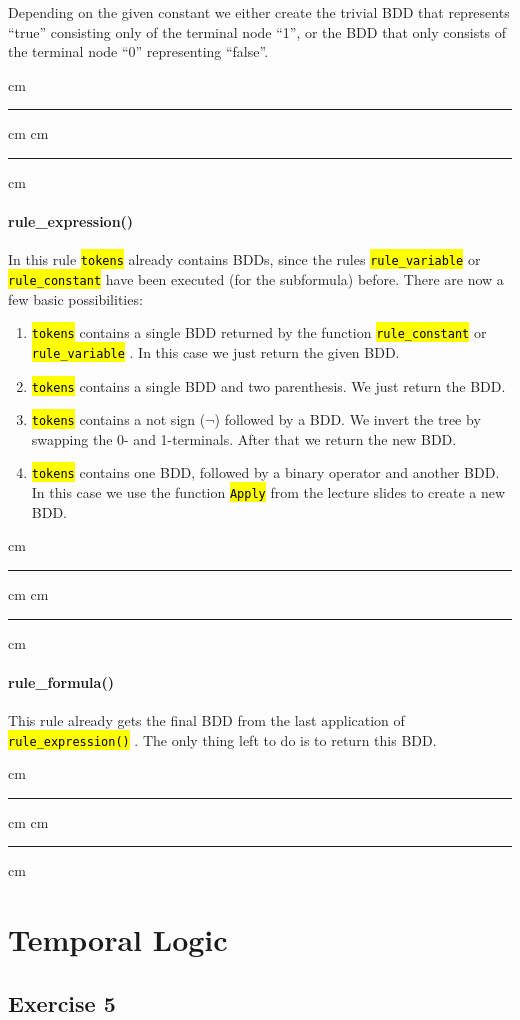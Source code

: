 \documentclass[a4paper, 11pt]{article}
\newcommand{\codeinput}[1]
{
    \vskip 0.3 cm
    {\color{lightgray}\hrule}\vskip 0.3 cm
    {\fontsize{9pt}{11pt}}
    \vskip 0.3 cm{\color{lightgray}\hrule}
    \vskip 0.3 cm
}
\newcommand{\code}[1]
{
    \hl{\texttt{#1}}
}
\begin{document}
Depending on the given constant we either create the trivial BDD that represents “true” consisting only of the terminal node “1”, or the BDD that only consists of the terminal node “0” representing “false”.

\codeinput{rule_constant}

\paragraph{rule\_expression()}

In this rule \code{tokens} already contains BDDs, since the rules \code{rule\_variable} or \code{rule\_constant} have been executed (for the subformula) before. There are now a few basic possibilities:

\begin{enumerate}
    \item \code{tokens} contains a single BDD returned by the function \code{rule\_constant} or \code{rule\_variable}. In this case we just return the given BDD.
    \item \code{tokens} contains a single BDD and two parenthesis. We just return the BDD.
    \item \code{tokens} contains a not sign ($¬$) followed by a BDD. We invert the tree by swapping the 0- and 1-terminals. After that we return the new BDD.
    \item \code{tokens} contains one BDD, followed by a binary operator and another BDD. In this case we use the function \code{Apply} from the lecture slides to create a new BDD.
\end{enumerate}

\codeinput{rule_expression}

\paragraph{rule\_formula()}

This rule already gets the final BDD from the last application of \code{rule\_expression()}. The only thing left to do is to return this BDD.

\codeinput{rule_formula}

\newpage
\section{Temporal Logic}

\subsection{Exercise 5}
\end{document}
